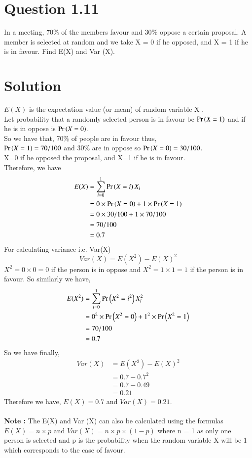 \documentclass[journal,12pt,twocolumn]{IEEEtran}
\begin{document}
\section*{Question 1.11}
In a meeting, $70\%$ of the members favour and $30\%$ oppose a certain proposal. A member is selected at random and we take X = 0 if he opposed, and X = 1 if he is in favour. Find E(X) and Var (X).
\section*{Solution}
$E(X)$ is the expectation value (or mean) of random variable X .\\
Let probability that a randomly selected person is in favour be $\Pr\left(X=    1\right)$ and if he is in oppose is $\Pr\left(X=0\right)$. \\
So we have that, 
70\% of people are in favour thus, \\ $\Pr\left(X=1\right)=70/100$ and 30\% are in oppose so $\Pr\left(X=0\right)= 30/100$. \\ 
X=0 if he opposed the proposal, and X=1 if he is in favour.\\
Therefore, we have
\begin{align*}
E(X)    & = \sum_{i=0}^{1}\Pr\left(X=i\right)X_i \\
         &= 0 \times \Pr\left(X=0\right) +1 \times \Pr\left(X=1\right) \\
         &= 0 \times 30/100 + 1 \times 70/100 \\
         &= 70/100 \\
         &= 0.7
\end{align*}
For calculating variance i.e. Var(X)
$$Var(X)= E(X^2)-E(X)^2$$
$X^2=0 \times 0= 0$ if the person is in oppose and $X^2 =1 \times 1=1$ if the person is in favour. So similarly we have,
\begin{align*}
    E(X^2)  & =\sum_{i=0}^{1}\Pr\left(X^2=i^2\right)X_i^2    \\
        &= 0^2 \times \Pr\left(X^2=0\right)  + 1^2 \times\Pr\left(X^2=1\right) \\ 
        &= 70/100  \\
        &= 0.7
\end{align*}
So we have finally,
\begin{align*}
    Var(X) &=   E(X^2)-E(X)^2 \\
    &= 0.7 - 0.7^2 \\
    &  = 0.7 -0.49  \\
    & = 0.21
\end{align*}
Therefore we have, $E(X)=0.7$ and $Var(X)=0.21$. \\ \\
\textbf{Note :}
The E(X) and Var (X) can also be calculated using the formulas
$ E(X) = n \times p $ and $Var(X) =n\times p \times (1-p) $ where n = 1 as only one person is selected and p is the probability when the random variable X will be 1 which corresponds to the case of favour. 
\end{document}
